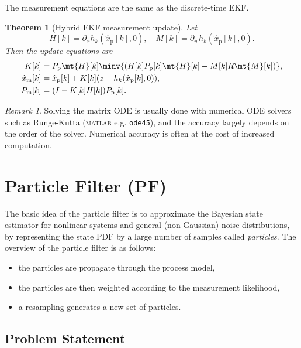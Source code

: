 \documentclass[]{hsrzf}
\theoremstyle{plain}
\newtheorem{thm}{Theorem}[section]
\theoremstyle{definition}
\theoremstyle{remark}
\newtheorem*{remark}{Remark}
\begin{document}
\ifexamprint\else
The measurement equations are the same as the discrete-time EKF.
\fi

\begin{thm}[Hybrid EKF measurement update]
  Let
  \[
    H[k] = \partial_x h_k(\hat{x}_\mathrm{p}[k], 0),
    \quad
    M[k] = \partial_w h_k(\hat{x}_\mathrm{p}[k], 0).
  \]
  Then the update equations are
  \begin{align*}
    K[k] &= P_\mathrm{p} \mt{H}[k]\minv{(
      H[k] P_\mathrm{p}[k] \mt{H}[k] + M[k] R \mt{M}[k])}, \\
    \hat{x}_\mathrm{m}[k] &= \hat{x}_\mathrm{p}[k]
      + K[k](\bar{z} - h_k(\hat{x}_\mathrm{p}[k], 0)), \\
    P_\mathrm{m}[k] &= (I - K[k] H[k]) P_\mathrm{p}[k].
  \end{align*}
\end{thm}

\ifexamprint\else
\begin{remark}
  Solving the matrix ODE is usually done with numerical ODE solvers such as
  Runge-Kutta (\textsc{matlab} e.g. \texttt{ode45}), and the accuracy largely
  depends on the order of the solver. Numerical accuracy is often at the cost
  of increased computation.
\end{remark}
\fi

\section{Particle Filter (PF)}

\ifexamprint\else
The basic idea of the particle filter is to approximate the Bayesian state
estimator for nonlinear systems and general (non Gaussian) noise
distributions, by representing the state PDF by a large number of samples
called \emph{particles}. The overview of the particle filter is as follows:
\begin{itemize}
  \item the particles are propagate through the process model,
  \item the particles are then weighted according to the measurement
    likelihood,
  \item a resampling generates a new set of particles.
\end{itemize}
\fi

\subsection{Problem Statement}
\end{document}
